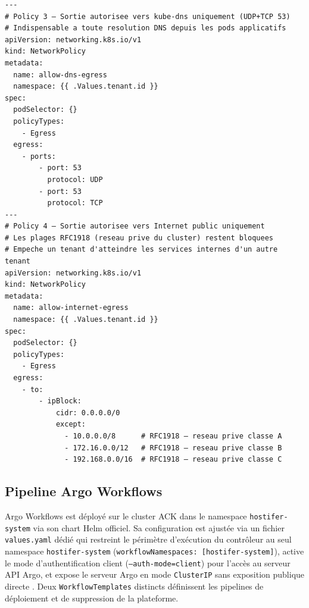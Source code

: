 \begin{longlisting}
\begin{mdframed}[
  linecolor=gray!40,
  backgroundcolor=gray!5,
  linewidth=0.5pt,
  innerleftmargin=6pt,
  innerrightmargin=6pt,
  innertopmargin=6pt,
  innerbottommargin=6pt,
  nobreak=false
]
\begin{verbatim}
---
# Policy 3 — Sortie autorisee vers kube-dns uniquement (UDP+TCP 53)
# Indispensable a toute resolution DNS depuis les pods applicatifs
apiVersion: networking.k8s.io/v1
kind: NetworkPolicy
metadata:
  name: allow-dns-egress
  namespace: {{ .Values.tenant.id }}
spec:
  podSelector: {}
  policyTypes:
    - Egress
  egress:
    - ports:
        - port: 53
          protocol: UDP
        - port: 53
          protocol: TCP
---
# Policy 4 — Sortie autorisee vers Internet public uniquement
# Les plages RFC1918 (reseau prive du cluster) restent bloquees
# Empeche un tenant d'atteindre les services internes d'un autre tenant
apiVersion: networking.k8s.io/v1
kind: NetworkPolicy
metadata:
  name: allow-internet-egress
  namespace: {{ .Values.tenant.id }}
spec:
  podSelector: {}
  policyTypes:
    - Egress
  egress:
    - to:
        - ipBlock:
            cidr: 0.0.0.0/0
            except:
              - 10.0.0.0/8      # RFC1918 — reseau prive classe A
              - 172.16.0.0/12   # RFC1918 — reseau prive classe B
              - 192.168.0.0/16  # RFC1918 — reseau prive classe C
\end{verbatim}
\end{mdframed}
\caption{Template NetworkPolicy (Partie 2) --- Autorisation DNS et sortie
         Internet avec exclusion des plages RFC1918
         (\texttt{tenant-chart/templates/networkpolicy.yaml})}
\label{lst:networkpolicy-2}
\end{longlisting}

\subsection{Pipeline Argo Workflows}

Argo Workflows est déployé sur le cluster ACK dans le namespace \texttt{hostifer-system} via son chart Helm officiel. Sa configuration est ajustée via un fichier \texttt{values.yaml} dédié qui restreint le périmètre d'exécution du contrôleur au seul namespace \texttt{hostifer-system} (\texttt{workflowNamespaces: [hostifer-system]}), active le mode d'authentification client (\texttt{--auth-mode=client}) pour l'accès au serveur API Argo, et expose le serveur Argo en mode \texttt{ClusterIP} sans exposition publique directe \cite{argo-install}. Deux \texttt{WorkflowTemplates} distincts définissent les pipelines de déploiement et de suppression de la plateforme.

